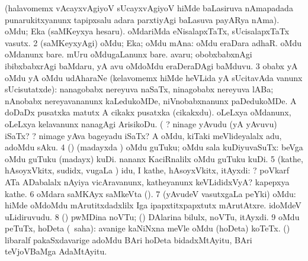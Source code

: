 \bentry
{}
\gl{\nA}
\bmng
(halavomemx vAcayxvAgiyoV sUcayxvAgiyoV hiMde baLasiruva nAmapadada punarukitxyanunx tapipxsalu adara parxtiyAgi baLasuva payARya nAma). 
\bnum
{} 
\banum
{} oMdu; Eka (saMKeyxya hesaru). 
 oMdariMda eNisalapxTaTx, sUcisalapxTaTx vasutx. 
\eanum
\numie
\num{2} (saMKeyxyAgi) oMdu; Eka; oMdu mAna:  oMdu eraDara adhaR.  oMdu oMdanunx bare.  mUru oMdugaLanunx bare.  avaru; obobxbabxnAgi ibibxbabxrAgi baMdaru, yA avu oMdoMdu eraDeraDAgi baMduvu. 
\num{3} obabx yA oMdu yA oMdu udAharaNe (kelavomemx hiMde heVLida yA sUcitavAda \nA vanunx sUcisutatxde):  nanagobabx nereyuva naSaTx, ninagobabx nereyuva lABa; nAnobabx nereyavananunx kaLedukoMDe, niVnobabxnanunx paDedukoMDe.  A doDaDx pusatxka matutx A cikakx pusatxka (cikakxdu).  oLeLxya oMdanunx, oLeLxya kelavanunx nanagAgi ArisikoDu. ( ? ninage yAvudu (yA yAvuvu) iSaTx? ? nimage yAva bageyadu iSaTx?  A oMdu, kiTaki meVlideyalalx adu, adoMdu sAku. 
\num{4} (\AmA) (madayxda \vi) oMdu guTuku; oMdu sala kuDiyuvaSuTx:  beVga oMdu guTuku (madayx) kuDi.  nananx KaciRnalilx oMdu guTuku kuDi. 
\num{5} (kathe, hAsoyxVkitx, sudidx, \mo vugaLa \vi) idu, I kathe, hAsoyxVkitx, itAyxdi: ? poVkarf ATa ADabalalx nAyiya vicAravanunx, katheyanunx keVLididxVyA?  kapepxya kathe. 
\num{6} oMdara saMKAyx saMkeVta (). 
\num{7} (yAvudeV vasutxgaLa peYki) oMdu:  hiMde oMdoMdu mArutitxdadxlilx Iga ipapxtitxpapxtutx mArutAtxre.  idoMdeV uLidiruvudu. 
\num{8} (\birx) pwMDina noVTu; (\ame) DAlarina bilulx, noVTu, itAyxdi. 
\num{9} oMdu peTuTx, hoDeta (\rUpa\ saha):  avanige kaNiNxna meVle oMdu (hoDeta) koTeTx.  (\rUpa) libaralf pakaSxdavarige adoMdu BAri hoDeta bidadxMtAyitu, BAri teVjoVBaMga AdaMtAyitu. 
\enum
\emng


